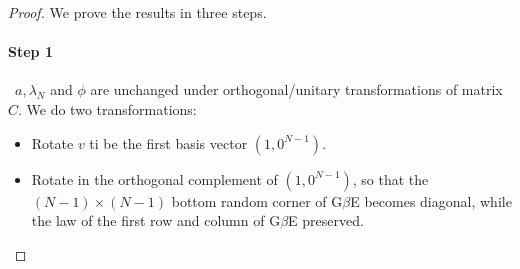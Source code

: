 \begin{proof}
    We prove the results in three steps.
    \paragraph{Step 1} \ $a, \lambda_N$ and $\phi$ are unchanged under orthogonal/unitary transformations of matrix $C$. We do two transformations:
    \begin{itemize}
        \item Rotate $v$ ti be the first basis vector $(1, 0^{N-1})$.
        \item Rotate in the orthogonal complement of $(1, 0^{N-1})$, so that the $(N-1)\times (N-1)$ bottom random corner of G$\beta$E becomes diagonal, while the law of the first row and column of G$\beta$E preserved.
    \end{itemize}

\end{proof}
